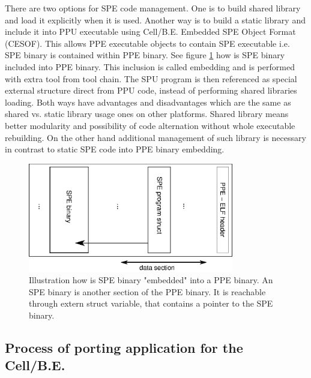 \par
There are two options for SPE code management.
One is to build shared library and load it explicitly when it is used.
Another way is to build a static library and include it into PPU executable using Cell/B.E. Embedded SPE Object Format (CESOF).
This allows PPE executable objects to contain SPE executable i.e. SPE binary is contained within PPE binary.
See figure \ref{fg:SPEEmbedding} how is SPE binary included into PPE binary.
This inclusion is called embedding and is performed with extra tool from tool chain.
The SPU program is then referenced as special external structure direct from PPU code, instead of performing shared libraries loading.
Both ways have advantages and disadvantages which are the same as shared vs. static library usage ones on other platforms.
Shared library means better modularity and possibility of code alternation without whole executable rebuilding.
On the other hand additional management of such library is necessary in contrast to static SPE code into PPE binary embedding.


\begin{figure}
    \centering
    \includegraphics[width=0.8\textwidth]{data/SPEEmbedding}
    \caption[SPE binary embedding]{Illustration how is SPE binary "embedded" into a PPE binary.
An SPE binary is another section of the PPE binary.
It is reachable through extern struct variable, that contains a pointer to the SPE binary.}
    \label{fg:SPEEmbedding}
\end{figure}



\subsection {Process of porting application for the Cell/B.E.}
\label{sect:portingProcess}

